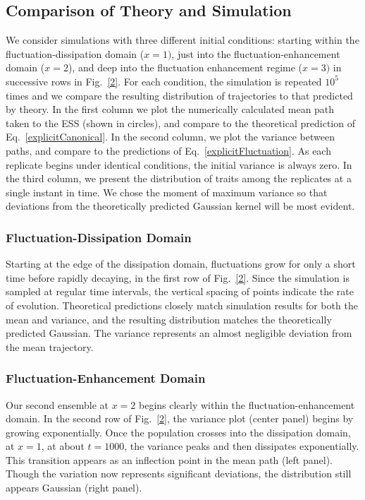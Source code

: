 \subsection{Comparison of Theory and Simulation}
We consider simulations with three different initial conditions: starting within the fluctuation-dissipation domain ($x = 1)$, just into the fluctuation-enhancement domain ($x = 2$), and deep into the fluctuation enhancement regime ($x = 3)$ in successive rows in Fig.~\ref{2}.  For each condition, the simulation is repeated $10^5$ times and we compare the resulting distribution of trajectories to that predicted by theory.  In the first column we plot the numerically
calculated mean path taken to the ESS (shown in circles), and 
compare to the theoretical prediction of Eq.~\eqref{explicitCanonical}.  In the second column, we plot the variance between paths, and compare to the predictions of Eq.~\eqref{explicitFluctuation}.  As each replicate begins under identical conditions, the initial variance is always zero. In the third column, we present the distribution of traits among the replicates at a single instant in time.  We chose the moment of maximum variance so that deviations from the theoretically predicted Gaussian kernel will be most evident. 
 
\subsubsection{Fluctuation-Dissipation Domain}
 Starting at the edge of the dissipation domain, fluctuations grow for only a short time before rapidly decaying, in the first row of Fig.~\ref{2}.  Since the simulation is sampled at regular time intervals, the vertical spacing of points indicate the rate of evolution.  Theoretical predictions closely match simulation results for both the mean and variance, and the resulting distribution matches the theoretically predicted Gaussian. The variance represents an almost negligible deviation from the mean trajectory.   
 
\subsubsection{Fluctuation-Enhancement Domain}
Our second ensemble at $x=2$ begins clearly within the fluctuation-enhancement domain.  In the second row of Fig.~\ref{2}, the variance plot (center panel) begins by growing exponentially.  Once the population crosses into the dissipation domain, at $x=1$, at about $t=1000$, the variance peaks and then dissipates exponentially.  This transition appears as an inflection point in the mean path (left panel).  Though the variation now represents significant deviations, the distribution still appears Gaussian (right panel).  
 
